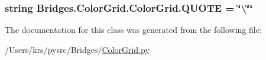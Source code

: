 \subsubsection[{Q\+U\+O\+T\+E}]{\setlength{\rightskip}{0pt plus 5cm}string Bridges.\+Color\+Grid.\+Color\+Grid.\+Q\+U\+O\+T\+E = \char`\"{}\textbackslash{}\char`\"{}\char`\"{}\hspace{0.3cm}{\ttfamily [static]}}\label{class_bridges_1_1_color_grid_1_1_color_grid_a002fefeb0638ed945322a41c386a5a77}


The documentation for this class was generated from the following file\+:\begin{DoxyCompactItemize}
\item 
/\+Users/krs/pysrc/\+Bridges/\hyperlink{_color_grid_8py}{Color\+Grid.\+py}\end{DoxyCompactItemize}
